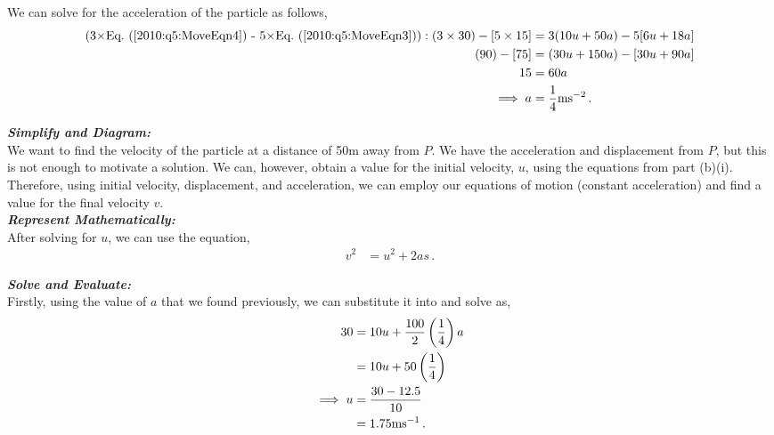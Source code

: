 \begin{subquestions}
\begin{subsubquestions}
We can solve for the acceleration of the particle as follows,
\begin{align}
	(\text{3$\times$\req{2010:q5:MoveEqn4} - 5$\times$\req{2010:q5:MoveEqn3}}): (3 \times 30) - [5 \times 15] & = 3(10u+50a) - 5[6u+18a] \nn \\
                                                                                                    (90)-[75] & = (30u+150a)-[30u+90a] \nn \\
                                                                                                           15 & = 60a \nn \\
                                                                                                           \implies a & = \frac{1}{4}\text{ms}^{-2} \,.
\end{align}


\subsubquestion
\textbf{\textit{Simplify and Diagram:}} \\
We want to find the velocity of the particle at a distance of 50m away from $P$. We have the acceleration and displacement from $P$, but this is not enough to motivate a solution. We can, however, obtain a value for the initial velocity, $u$, using the equations from part (b)(i). Therefore, using initial velocity, displacement, and acceleration, we can employ our equations of motion (constant acceleration) and find a value for the final velocity $v$. \\




\textbf{\textit{Represent Mathematically:}} \\
After solving for $u$, we can use the equation,
\begin{align}
	v^2 & = u^2 + 2as \label{2010:q5:MoveEqn5} \,. 
\end{align}




\textbf{\textit{Solve and Evaluate:}} \\
Firstly, using the value of $a$ that we found previously, we can substitute it into  and solve as,
\begin{align}
	30 & = 10u + \frac{100}{2}\left(\frac{1}{4}\right)a \nonumber \\
	   & = 10u + 50\left(\frac{1}{4}\right) \nonumber \\
	   \implies u & = \frac{30-12.5}{10} \nonumber \\
	   & = 1.75 \text{ms}^{-1} \,.
\end{align}


\end{subsubquestions}
\end{subquestions}
